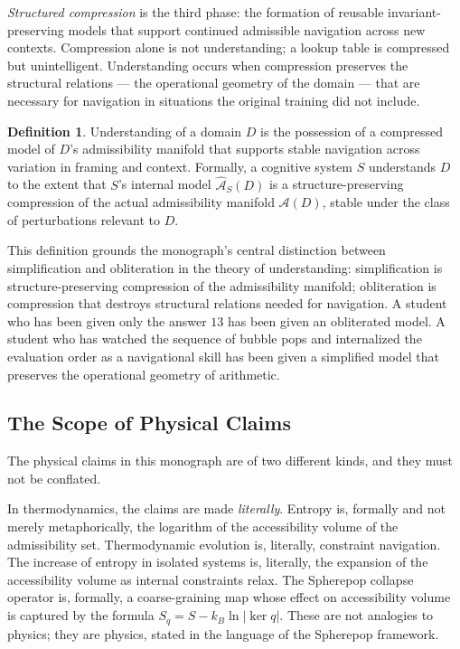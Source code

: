 \documentclass[12pt,openany]{book}
\theoremstyle{plain}
\theoremstyle{definition}
\newtheorem{definition}[theorem]{Definition}
\theoremstyle{remark}
\begin{document}
\emph{Structured compression} is the third phase: the formation of reusable invariant-preserving models that support continued admissible navigation across new contexts. Compression alone is not understanding; a lookup table is compressed but unintelligent. Understanding occurs when compression preserves the structural relations — the operational geometry of the domain — that are necessary for navigation in situations the original training did not include.

\begin{definition}
Understanding of a domain $D$ is the possession of a compressed model of $D$'s admissibility manifold that supports stable navigation across variation in framing and context. Formally, a cognitive system $S$ understands $D$ to the extent that $S$'s internal model $\hat{\mathcal{A}}_S(D)$ is a structure-preserving compression of the actual admissibility manifold $\mathcal{A}(D)$, stable under the class of perturbations relevant to $D$.
\end{definition}

This definition grounds the monograph's central distinction between simplification and obliteration in the theory of understanding: simplification is structure-preserving compression of the admissibility manifold; obliteration is compression that destroys structural relations needed for navigation. A student who has been given only the answer $13$ has been given an obliterated model. A student who has watched the sequence of bubble pops and internalized the evaluation order as a navigational skill has been given a simplified model that preserves the operational geometry of arithmetic.

\subsection*{The Scope of Physical Claims}

The physical claims in this monograph are of two different kinds, and they must not be conflated.

In thermodynamics, the claims are made \emph{literally}. Entropy is, formally and not merely metaphorically, the logarithm of the accessibility volume of the admissibility set. Thermodynamic evolution is, literally, constraint navigation. The increase of entropy in isolated systems is, literally, the expansion of the accessibility volume as internal constraints relax. The Spherepop collapse operator is, formally, a coarse-graining map whose effect on accessibility volume is captured by the formula $S_q = S - k_B \ln |\ker q|$. These are not analogies to physics; they are physics, stated in the language of the Spherepop framework.
\end{document}
